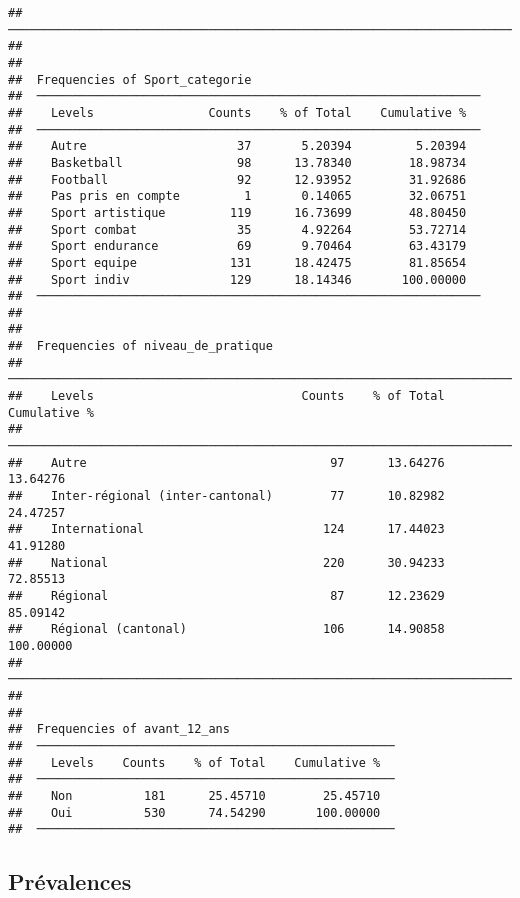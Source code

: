 \documentclass[
]{article}
\begin{document}
\begin{verbatim}
##  ────────────────────────────────────────────────────────────────────────────────── 
## 
## 
##  Frequencies of Sport_categorie                                 
##  ────────────────────────────────────────────────────────────── 
##    Levels                Counts    % of Total    Cumulative %   
##  ────────────────────────────────────────────────────────────── 
##    Autre                     37       5.20394         5.20394   
##    Basketball                98      13.78340        18.98734   
##    Football                  92      12.93952        31.92686   
##    Pas pris en compte         1       0.14065        32.06751   
##    Sport artistique         119      16.73699        48.80450   
##    Sport combat              35       4.92264        53.72714   
##    Sport endurance           69       9.70464        63.43179   
##    Sport equipe             131      18.42475        81.85654   
##    Sport indiv              129      18.14346       100.00000   
##  ────────────────────────────────────────────────────────────── 
## 
## 
##  Frequencies of niveau_de_pratique                                           
##  ─────────────────────────────────────────────────────────────────────────── 
##    Levels                             Counts    % of Total    Cumulative %   
##  ─────────────────────────────────────────────────────────────────────────── 
##    Autre                                  97      13.64276        13.64276   
##    Inter-régional (inter-cantonal)        77      10.82982        24.47257   
##    International                         124      17.44023        41.91280   
##    National                              220      30.94233        72.85513   
##    Régional                               87      12.23629        85.09142   
##    Régional (cantonal)                   106      14.90858       100.00000   
##  ─────────────────────────────────────────────────────────────────────────── 
## 
## 
##  Frequencies of avant_12_ans                        
##  ────────────────────────────────────────────────── 
##    Levels    Counts    % of Total    Cumulative %   
##  ────────────────────────────────────────────────── 
##    Non          181      25.45710        25.45710   
##    Oui          530      74.54290       100.00000   
##  ──────────────────────────────────────────────────
\end{verbatim}

\hypertarget{pruxe9valences-1}{%
\subsection{Prévalences}\label{pruxe9valences-1}}
\end{document}
